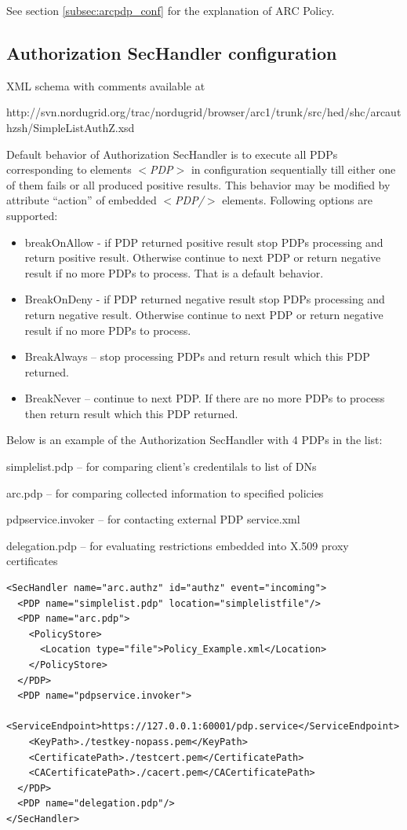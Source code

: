 \documentclass{article}                            %
\begin{document}
See section \ref{subsec:arcpdp_conf} for the explanation of ARC Policy.


\subsection{Authorization SecHandler configuration} %
\label{subsec:authzhandler_conf}
XML schema with comments available at

http://svn.nordugrid.org/trac/nordugrid/browser/arc1/trunk/src/hed/shc/arcauthzsh/SimpleListAuthZ.xsd

Default behavior of Authorization SecHandler is to execute all PDPs corresponding to elements \textit{$<$PDP$>$} in configuration sequentially till either one of them fails or all produced positive results. This behavior may be modified by attribute ``action'' of embedded \textit{$<$PDP/$>$} elements. Following options are supported:

    \begin{itemize}
        \item breakOnAllow - if PDP returned positive result stop PDPs processing and return positive result. Otherwise continue to next PDP or return negative result if no more PDPs to process. That is a default behavior.
        \item BreakOnDeny - if PDP returned negative result stop PDPs processing and return negative result. Otherwise continue to next PDP or return negative result if no more PDPs to process.
        \item BreakAlways – stop processing PDPs and return result which this PDP returned.
        \item BreakNever – continue to next PDP. If there are no more PDPs to process then return result which this PDP returned.
    \end{itemize}

Below is an example of the Authorization SecHandler with 4 PDPs in the list:

simplelist.pdp – for comparing client's credentilals to list of DNs

arc.pdp – for comparing collected information to specified policies

pdpservice.invoker – for contacting external PDP service.xml

delegation.pdp – for evaluating restrictions embedded into X.509 proxy certificates

\begin{verbatim}
<SecHandler name="arc.authz" id="authz" event="incoming">
  <PDP name="simplelist.pdp" location="simplelistfile"/>
  <PDP name="arc.pdp">
    <PolicyStore>
      <Location type="file">Policy_Example.xml</Location>
    </PolicyStore>
  </PDP>
  <PDP name="pdpservice.invoker">
    <ServiceEndpoint>https://127.0.0.1:60001/pdp.service</ServiceEndpoint>
    <KeyPath>./testkey-nopass.pem</KeyPath>
    <CertificatePath>./testcert.pem</CertificatePath>
    <CACertificatePath>./cacert.pem</CACertificatePath>
  </PDP>
  <PDP name="delegation.pdp"/>
</SecHandler>
\end{verbatim}
\end{document}
